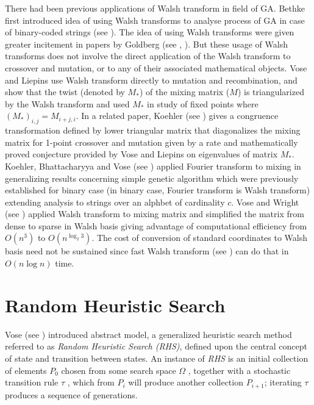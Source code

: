 There had been previous applications of Walsh transform in field of GA. Bethke first introduced 
idea of using Walsh transforms to analyse process of GA in case of binary-coded strings (see \cite{Bethke1981}). The idea of using Walsh transforms 
were given greater incitement in papers by Goldberg (see \cite{Goldberg1989a}, \cite{Goldberg1989b}). But these usage of 
Walsh transforms does not involve the direct application of the Walsh transform to crossover and mutation, or to any of their 
associated mathematical objects. Vose and Liepins use Walsh transform directly to mutation and recombination, and show that the 
twist (denoted by $M_*$) of the mixing matrix ($M$) is triangularized by the Walsh transform and used $M_*$ in study of 
fixed points where $(M_*)_{i,j} = M_{i+j, i}$. In a related paper, Koehler (see \cite{Koehler1994}) gives a congruence 
transformation defined by lower triangular matrix that diagonalizes the mixing matrix for 1-point crossover and mutation 
given by a rate and mathematically proved conjecture provided by Vose and Liepins on eigenvalues of matrix $M_*$. Koehler, Bhattacharyya 
and Vose (see \cite{KoehlerBhatta1997}) applied Fourier transform to mixing in generalizing results concerning simple genetic algorithm 
which were previously established for binary case (in binary case, Fourier transform is Walsh transform) extending analysis to 
strings over an alphbet of cardinality $c$. Vose and Wright (see \cite{VoseWright1998}) applied Walsh transform to mixing matrix and 
simplified the matrix from dense to sparse in Walsh basis giving advantage of computational efficiency from 
$O(n^3)$ to $O(n^{{\log}_2 3})$. The cost of conversion of standard coordinates to Walsh basis need not be sustained 
since fast Walsh transform (see \cite{Shanks1969}) can do that in $O(n \log n)$ time.

\section{Random Heuristic Search}
Vose (see \cite{Vose1999}) introduced abstract model, a generalized heuristic search method referred 
to as {\em Random Heuristic Search (RHS)}, defined upon the central concept of state and transition 
between states. An instance of {\em RHS} is an initial collection of elements $P_0$ chosen 
from some search space $\Omega$ , together with a stochastic transition rule $\tau$ , which from $P_i$ will 
produce another collection $P_{i+1}$; iterating $\tau$ produces a sequence of generations.

